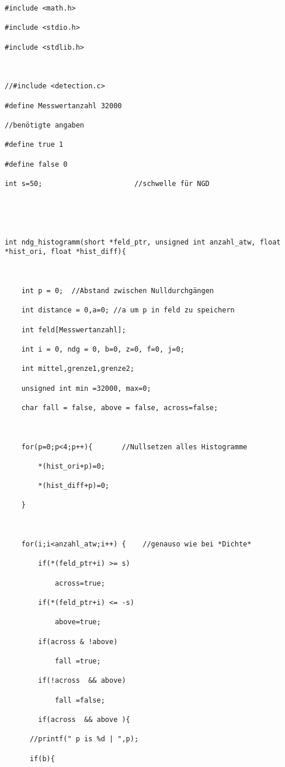 \documentclass[a4paper,12pt]{article}
\begin{document}
\begin{lstlisting}[caption={histo.c}]
#include <math.h>

#include <stdio.h>

#include <stdlib.h>



//#include <detection.c>

#define Messwertanzahl 32000

//benötigte angaben

#define true 1

#define false 0

int s=50;                      //schwelle für NGD





int ndg_histogramm(short *feld_ptr, unsigned int anzahl_atw, float *hist_ori, float *hist_diff){



	int p = 0;	//Abstand zwischen Nulldurchgängen

	int distance = 0,a=0; //a um p in feld zu speichern

	int feld[Messwertanzahl];

	int i = 0, ndg = 0, b=0, z=0, f=0, j=0;

	int mittel,grenze1,grenze2;

	unsigned int min =32000, max=0;

	char fall = false, above = false, across=false;



	for(p=0;p<4;p++){ 		//Nullsetzen alles Histogramme

		*(hist_ori+p)=0;

		*(hist_diff+p)=0;

	}



	for(i;i<anzahl_atw;i++) {    //genauso wie bei *Dichte*

		if(*(feld_ptr+i) >= s)

			across=true;

		if(*(feld_ptr+i) <= -s)

			above=true;

		if(across & !above)

			fall =true;

		if(!across  && above)

			fall =false;

		if(across  && above ){

      //printf(" p is %d | ",p);

      if(b){


\end{lstlisting}
\end{document}
